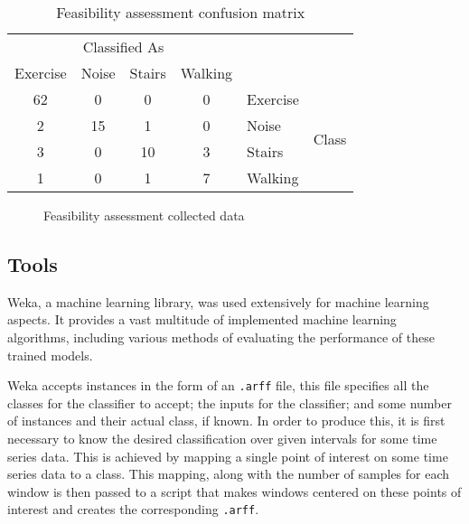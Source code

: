 \begin{table}
	\centering
	\begin{tabular}{|cccc|ll|}
		\hline
		\multicolumn{4}{|c|}{Classified As}   &          &                        \\
		Exercise & Noise & Stairs & Walking &          &                        \\
		\hline
		62       & 0     & 0      & 0       & Exercise & \multirow{4}{*}{Class} \\
		2        & 15    & 1      & 0       & Noise    &                        \\
		3        & 0     & 10     & 3       & Stairs   &                        \\
		1        & 0     & 1      & 7       & Walking  &                       \\
		\hline
	\end{tabular}
	\caption{Feasibility assessment confusion matrix \label{tab:first-confusion}}
\end{table}

\begin{figure}
	\centering
	\caption{Feasibility assessment collected data \label{fig:first-data}}
\end{figure}

\subsection{Tools \label{sec:tools}}
Weka, a machine learning library, was used extensively for machine learning aspects. It provides a vast multitude of implemented machine learning algorithms, including various methods of evaluating the performance of these trained models.

Weka accepts instances in the form of an \texttt{.arff} file, this file specifies all the classes for the classifier to accept; the inputs for the classifier; and some number of instances and their actual class, if known. In order to produce this, it is first necessary to know the desired classification over given intervals for some time series data. This is achieved by mapping a single point of interest on some time series data to a class. This mapping, along with the number of samples for each window is then passed to a script that makes windows centered on these points of interest and creates the corresponding \texttt{.arff}.

